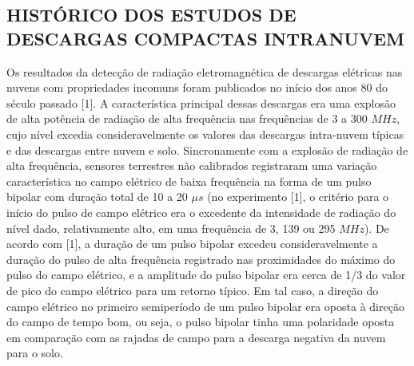 \documentclass[a4paper, 12pt, onecolumn,singlespacing]{article}
\begin{document}
	\subsection{HISTÓRICO DOS ESTUDOS DE DESCARGAS COMPACTAS INTRANUVEM}
	
	Os resultados da detecção de radiação eletromagnética de descargas elétricas nas nuvens com propriedades incomuns foram publicados no início dos anos 80 do século passado [1]. A característica principal dessas descargas era uma explosão de alta potência de radiação de alta frequência nas frequências de 3 a 300 $MHz$, cujo nível excedia consideravelmente os valores das descargas intra-nuvem típicas e das descargas entre nuvem e solo. Sincronamente com a explosão de radiação de alta frequência, sensores terrestres não calibrados registraram uma variação característica no campo elétrico de baixa frequência na forma de um pulso bipolar com duração total de 10 a 20 $\mu s$ (no experimento [1], o critério para o início do pulso de campo elétrico era o excedente da intensidade de radiação do nível dado, relativamente alto, em uma frequência de 3, 139 ou 295 $MHz$). De acordo com [1], a duração de um pulso bipolar excedeu consideravelmente a duração do pulso de alta frequência registrado nas proximidades do máximo do pulso do campo elétrico, e a amplitude do pulso bipolar era cerca de 1/3 do valor de pico do campo elétrico para um retorno típico. Em tal caso, a direção do campo elétrico no primeiro semiperíodo de um pulso bipolar era oposta à direção do campo de tempo bom, ou seja, o pulso bipolar tinha uma polaridade oposta em comparação com as rajadas de campo para a descarga negativa da nuvem para o solo.
	
\end{document}
